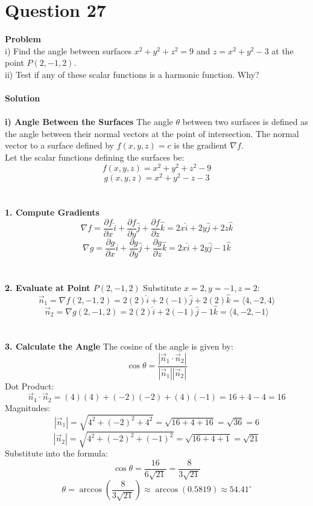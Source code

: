 \documentclass{article}
\begin{document}
\section{Question 27}
\textbf{Problem} \\
i) Find the angle between surfaces $x^2 + y^2 + z^2 = 9$ and $z = x^2 + y^2 - 3$ at the point $P(2, -1, 2)$. \\
ii) Test if any of these scalar functions is a harmonic function. Why?
\\
\\
\textbf{Solution}
\\
\\
\textbf{i) Angle Between the Surfaces}
The angle $\theta$ between two surfaces is defined as the angle between their
normal vectors at the point of intersection. The normal vector to a surface
defined by $f(x,y,z) = c$ is the gradient $\nabla f$.
\\
Let the scalar functions defining the surfaces be:
\[ f(x,y,z) = x^2 + y^2 + z^2 - 9 \]
\[ g(x,y,z) = x^2 + y^2 - z - 3 \]
\\
\\
\textbf{1. Compute Gradients}
\[
	\nabla f = \frac{\partial f}{\partial x}\hat{i} + \frac{\partial f}{\partial y}\hat{j} + \frac{\partial f}{\partial z}\hat{k} = 2x\hat{i} + 2y\hat{j} + 2z\hat{k}
\]
\[
	\nabla g = \frac{\partial g}{\partial x}\hat{i} + \frac{\partial g}{\partial y}\hat{j} + \frac{\partial g}{\partial z}\hat{k} = 2x\hat{i} + 2y\hat{j} - 1\hat{k}
\]
\\
\\
\textbf{2. Evaluate at Point $P(2, -1, 2)$}
Substitute $x=2, y=-1, z=2$:
\[
	\vec{n}_1 = \nabla f(2, -1, 2) = 2(2)\hat{i} + 2(-1)\hat{j} + 2(2)\hat{k} = \langle 4, -2, 4 \rangle
\]
\[
	\vec{n}_2 = \nabla g(2, -1, 2) = 2(2)\hat{i} + 2(-1)\hat{j} - 1\hat{k} = \langle 4, -2, -1 \rangle
\]
\\
\\
\textbf{3. Calculate the Angle}
The cosine of the angle is given by:
\[
	\cos \theta = \frac{|\vec{n}_1 \cdot \vec{n}_2|}{|\vec{n}_1| |\vec{n}_2|}
\]
Dot Product:
\[
	\vec{n}_1 \cdot \vec{n}_2 = (4)(4) + (-2)(-2) + (4)(-1) = 16 + 4 - 4 = 16
\]
Magnitudes:
\[
	|\vec{n}_1| = \sqrt{4^2 + (-2)^2 + 4^2} = \sqrt{16 + 4 + 16} = \sqrt{36} = 6
\]
\[
	|\vec{n}_2| = \sqrt{4^2 + (-2)^2 + (-1)^2} = \sqrt{16 + 4 + 1} = \sqrt{21}
\]
Substitute into the formula:
\[
	\cos \theta = \frac{16}{6\sqrt{21}} = \frac{8}{3\sqrt{21}}
\]
\[
	\theta = \arccos\left( \frac{8}{3\sqrt{21}} \right) \approx \arccos(0.5819) \approx 54.41^\circ
\]
\end{document}
